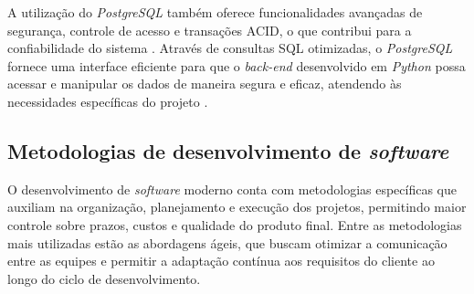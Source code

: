 A utilização do \textit{PostgreSQL} também oferece funcionalidades avançadas de segurança, controle de acesso e transações ACID, o que contribui para a confiabilidade do sistema \cite{postgresqlsecurity}. Através de consultas SQL otimizadas, o \textit{PostgreSQL} fornece uma interface eficiente para que o \textit{back-end} desenvolvido em \textit{Python} possa acessar e manipular os dados de maneira segura e eficaz, atendendo às necessidades específicas do projeto \cite{sqloptimization}.

\subsection{Metodologias de desenvolvimento de \textit{software}}

O desenvolvimento de \textit{software} moderno conta com metodologias específicas que auxiliam na organização, planejamento e execução dos projetos, permitindo maior controle sobre prazos, custos e qualidade do produto final. Entre as metodologias mais utilizadas estão as abordagens ágeis, que buscam otimizar a comunicação entre as equipes e permitir a adaptação contínua aos requisitos do cliente ao longo do ciclo de desenvolvimento.

